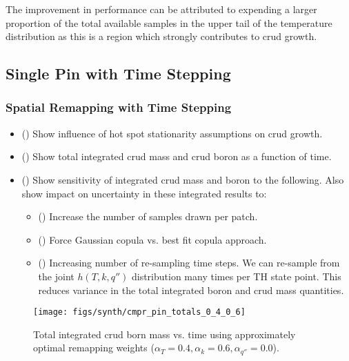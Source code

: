 The improvement in performance can be attributed to expending a larger proportion of the total available samples in the upper tail of the temperature distribution as this is a region which strongly contributes to crud growth.


\subsection{Single Pin with Time Stepping}

\subsubsection{Spatial Remapping with Time Stepping}
\begin{itemize}
        \item (\checkmark) Show influence of hot spot stationarity assumptions on crud growth.
\end{itemize}

\begin{itemize}
        \item (\checkmark) Show total integrated crud mass and crud boron as a function of time.
        \item (\checkmark) Show sensitivity of integrated crud mass and boron to the following.  Also show impact on uncertainty in these integrated results to:
        \begin{itemize}
                \item (\checkmark) Increase the number of samples drawn per patch.
                \item (\checkmark) Force Gaussian copula vs. best fit copula approach.
                \item (\checkmark) Increasing number of re-sampling time steps.
                We can re-sample from the joint $h(T, k, q'')$ distribution many times per TH state point.
                This reduces variance in the total integrated boron and crud mass quantities.
        \end{itemize}
\end{itemize}

\begin{figure}[H]
    \centering
    \texttt{[image: figs/synth/cmpr\_pin\_totals\_0\_4\_0\_6]}
    \caption[Total integrated crud born mass vs. time using approximately optimal remapping weights.]{Total integrated crud born mass vs. time using approximately optimal remapping weights ($\alpha_T=0.4, \alpha_{k}=0.6, \alpha_{q''}=0.0$).}
    \label{fig:cmprpintotals0406}
\end{figure}

